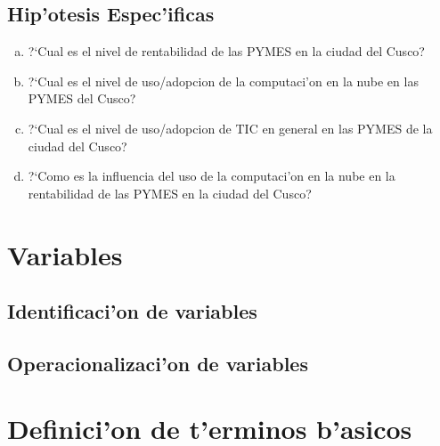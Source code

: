 \subsection{Hip'otesis Espec'ificas}
\begin{enumerate}[a.]
\item ?`Cual es el nivel de rentabilidad de las PYMES en la ciudad del Cusco?
\item ?`Cual es el nivel de uso/adopcion de la computaci'on en la nube en las PYMES del Cusco?
\item ?`Cual es el nivel de uso/adopcion de TIC en general en las PYMES de la ciudad del Cusco?
\item ?`Como es la influencia del uso de la computaci'on en la nube en la rentabilidad de las PYMES en la ciudad del Cusco?
\end{enumerate}

\section{Variables}

\subsection{Identificaci'on de variables}

\subsection{Operacionalizaci'on de variables}

\section{Definici'on de t'erminos b'asicos}
